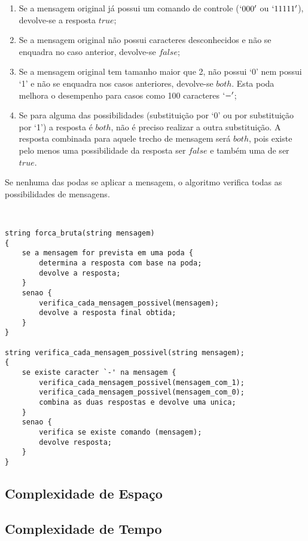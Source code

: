 \documentclass[a4paper,12pt,titlepage]{article}
\begin{document}
\begin{enumerate}[leftmargin=1.5cm]
    \item Se a mensagem original já possui um comando de controle ($`000'$ ou $`11111'$), devolve-se a resposta $true$;  
    \item Se a mensagem original não possui caracteres desconhecidos e não se enquadra no caso anterior, devolve-se $false$;
    \item Se a mensagem original tem tamanho maior que 2, não possui `0' nem possui `1' e não se enquadra nos casos anteriores, devolve-se $both$. Esta poda melhora o desempenho para casos como 100 caracteres $`-'$;
    \item Se para alguma das possibilidades (substituição por `0' ou por substituição por `1') a resposta é $both$, não é preciso realizar a outra substituição. A resposta combinada para aquele trecho de mensagem será $both$, pois existe pelo menos uma possibilidade da resposta ser $false$ e também uma de ser $true$.
    \ \\
\end{enumerate}

Se nenhuma das podas se aplicar a mensagem, o algoritmo verifica todas as possibilidades de mensagens.


\ \\ 
\begin{lstlisting}[caption=Algoritmo de Força Bruta]
string forca_bruta(string mensagem)
{
    se a mensagem for prevista em uma poda {
        determina a resposta com base na poda;
        devolve a resposta;
    } 
    senao {
        verifica_cada_mensagem_possivel(mensagem);
        devolve a resposta final obtida;
    }
}

string verifica_cada_mensagem_possivel(string mensagem);
{
    se existe caracter `-' na mensagem {
        verifica_cada_mensagem_possivel(mensagem_com_1);
        verifica_cada_mensagem_possivel(mensagem_com_0);
        combina as duas respostas e devolve uma unica;
    }
    senao {
        verifica se existe comando (mensagem);
        devolve resposta;
    }
}

\end{lstlisting}

\subsection{Complexidade de Espaço}
\subsection{Complexidade de Tempo}
\end{document}
